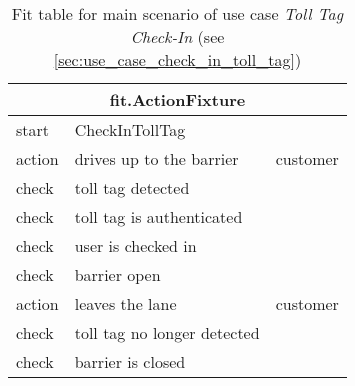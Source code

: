 
\begin{table}[H]
\begin{centering}
\begin{tabular}{|l|l|l|}
\hline 
\multicolumn{3}{|c|}{fit.ActionFixture} \tabularnewline
\hline 
start & CheckInTollTag & \tabularnewline
\hline 
action & drives up to the barrier & customer \tabularnewline
\hline 
check & toll tag detected & \tabularnewline
\hline 
check & toll tag is authenticated & \tabularnewline
\hline 
check & user is checked in & \tabularnewline
\hline 
check & barrier open & \tabularnewline
\hline 
action & leaves the lane & customer \tabularnewline
\hline 
check & toll tag no longer detected & \tabularnewline
\hline 
check & barrier is closed & \tabularnewline
\hline 
\end{tabular}
\par\end{centering}

\caption{Fit table for main scenario of use case \emph{Toll Tag Check-In} (see \autoref{sec:use_case_check_in_toll_tag})}
\end{table}

